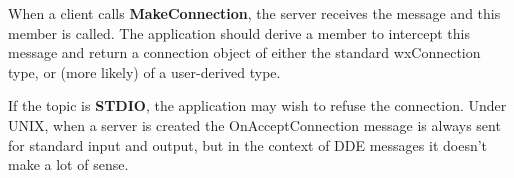 \label{wxserveronacceptconnection}


When a client calls {\bf MakeConnection}, the server receives the
message and this member is called. The application should derive a
member to intercept this message and return a connection object of
either the standard wxConnection type, or (more likely) of a
user-derived type.

If the topic is {\bf STDIO}, the application may wish to refuse the
connection. Under UNIX, when a server is created the
OnAcceptConnection message is always sent for standard input and
output, but in the context of DDE messages it doesn't make a lot
of sense.

